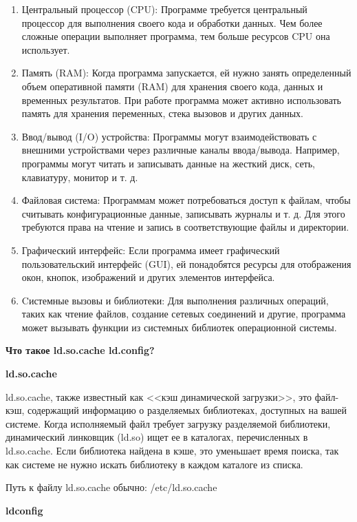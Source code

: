 \documentclass[oneside, final, 14pt]{extreport} %
\begin{document}
\begin{enumerate}
    \item Центральный процессор (CPU): Программе требуется центральный процессор для выполнения своего кода и обработки данных. Чем более сложные операции выполняет программа, тем больше ресурсов CPU она использует.
    \item Память (RAM): Когда программа запускается, ей нужно занять определенный объем оперативной памяти (RAM) для хранения своего кода, данных и временных результатов. При работе программа может активно использовать память для хранения переменных, стека вызовов и других данных.
    \item Ввод/вывод (I/O) устройства: Программы могут взаимодействовать с внешними устройствами через различные каналы ввода/вывода. Например, программы могут читать и записывать данные на жесткий диск, сеть, клавиатуру, монитор и т. д.
    \item Файловая система: Программам может потребоваться доступ к файлам, чтобы считывать конфигурационные данные, записывать журналы и т. д. Для этого требуются права на чтение и запись в соответствующие файлы и директории.
    \item Графический интерфейс: Если программа имеет графический пользовательский интерфейс (GUI), ей понадобятся ресурсы для отображения окон, кнопок, изображений и других элементов интерфейса.
    \item Cистемные вызовы и библиотеки: Для выполнения различных операций, таких как чтение файлов, создание сетевых соединений и другие, программа может вызывать функции из системных библиотек операционной системы.
\end{enumerate}

\vspace*{\baselineskip}

\textbf{Что такое ld.so.cache ld.config?}

\textbf{ld.so.cache}

ld.so.cache, также известный как <<кэш динамической загрузки>>, это файл-кэш, содержащий информацию о разделяемых библиотеках, доступных на вашей системе. Когда исполняемый файл требует загрузку разделяемой библиотеки, динамический линковщик (ld.so) ищет ее в каталогах, перечисленных в ld.so.cache. Если библиотека найдена в кэше, это уменьшает время поиска, так как системе не нужно искать библиотеку в каждом каталоге из списка.

Путь к файлу ld.so.cache обычно: /etc/ld.so.cache

\textbf{ldconfig}
\end{document}
